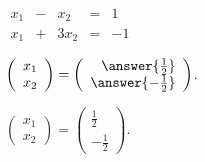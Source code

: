 \documentclass{ximera}
\begin{document}
\begin{exercise} \label{c2.5.1B}
\qquad $\begin{array}{rcrcr}
 x_1 & - &  x_2 & = &  1\\
 x_1 & + & 3x_2 & = & -1
        \end{array}$
        \begin{prompt}
          $\left(\begin{array}{c} x_1 \\ x_2\end{array}\right) =
\left(\begin{array}{r} \answer{\frac{1}{2}} \\ \answer{-\frac{1}{2}} \end{array}\right)$.
        \end{prompt}

\begin{solution}

$\left(\begin{array}{c} x_1 \\ x_2\end{array}\right) =
\left(\begin{array}{r} \frac{1}{2} \\ -\frac{1}{2} \end{array}\right)$.


\end{solution}
\end{exercise}
\end{document}
